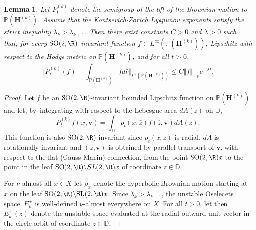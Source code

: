 \documentclass[10pt]{amsart}
\theoremstyle{plain}
\newtheorem{lemma}[thm]{Lemma}
\theoremstyle{definition}
\numberwithin{equation}{subsection}
\newcommand\bD{\mathbb{D}}
\newcommand\bP{\mathbb{P}}
\newcommand{\SL}{\mathrm{SL}}
\newcommand{\SO}{\mathrm{SO}}
\newcommand{\bfH}{\boldsymbol{H}}
\newcommand{\bfv}{\boldsymbol{v}}
\begin{document}
\begin{lemma}
\label{lemma:exp}
Let ${P^{(k)}_t}$ denote the semigroup of the lift of the Brownian motion to $\bP(\bfH^{(k)})$. Assume
that the Kontsevich-Zorich Lyapunov exponents satisfy the strict inequality $\lambda_k >\lambda_{k+1}$. Then there exist constants $C>0$ and $\lambda>0$ such that,
for every $\SO(2, \R)$-invariant function $f\in L^\infty(\bP(\bfH^{(k)}))$, Lipschitz with respect to the Hodge metric on $\bP(\bfH^{(k)})$, and for all $t>0$,
\[
\biggl\Vert P^{(k)}_t (f) - \int_{\bP(\bfH^{(k)})} f d\hat{\nu} \biggr\Vert_{L^2(\bP(\bfH^{(k)}))} \leq C \Vert f \Vert_\mathrm{Lip} e^{-\lambda t}.
\]
\end{lemma}
\begin{proof}
Let $f$ be an $\SO(2,\R)$-invariant bounded Lipschitz function on $\bP(\bfH^{(k)})$ and let, by~integrating with respect to the Lebesgue area $dA(z)$ on $\bD$,
\[
P^{(k)}_t f (x, \bfv) = \int_\bD p_t(x,\bar z) f(\bar z,\bfv) dA(z).
\]
This function is also $\SO(2,\R)$-invariant since $p_t(x,\bar z)$ is radial, $dA$ is rotationally invariant and
$(\bar z,\bfv)$ is obtained by parallel transport of $\bfv$, with respect to the flat (Gauss-Manin) connection, from the point $\SO(2,\R)x$ to the point in the leaf $\SO(2,\R)\backslash SL(2,\R)x$ of coordinate $z\in \bD$.

For $\nu$-almost all $x \in X$ let
$\rho_x$ denote the hyperbolic Brownian motion starting
at $x$ on the leaf $\SO(2, \R) \backslash \SL(2, \R)x$.
Since $\lambda_{k} > \lambda_{k+1}$, the unstable Oseledets space~$E^+_k$ is well-defined $\nu$-almost everywhere on $X$. For all $t >0$, let then $E^+_k(z)$ denote the
unstable space evaluated at the radial outward unit vector in the circle orbit of coordinate $z\in \bD$.


\end{proof}
\end{document}
